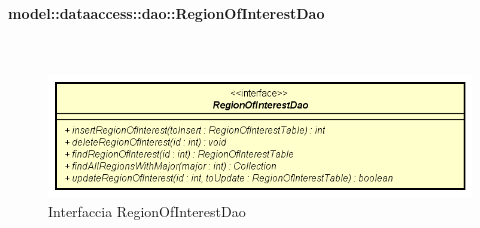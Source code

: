 \documentclass[../DefinizioneDiProdotto.tex]{subfiles}
\begin{document}
\paragraph{model::dataaccess::dao::RegionOfInterestDao}
\
\begin{figure}[H]
	\centering
	\includegraphics[width=\maxwidth]{img/RegionOfInterestDao.png}
	\caption{Interfaccia RegionOfInterestDao}\label{fig:model::dataaccess::dao::RegionOfInterestDao} 
\end{figure}
\end{document}
